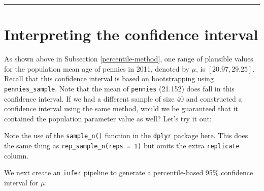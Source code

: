 \documentclass[12pt, krantz2,]{krantz}
\makeatletter
\newenvironment{Shaded}{\begin{snugshade}}{\end{snugshade}}
\newcommand{\DataTypeTok}[1]{\textcolor[rgb]{0.27,0.27,0.27}{#1}}
\newcommand{\DecValTok}[1]{\textcolor[rgb]{0.06,0.06,0.06}{#1}}
\newcommand{\KeywordTok}[1]{\textcolor[rgb]{0.27,0.27,0.27}{\textbf{#1}}}
\newcommand{\NormalTok}[1]{#1}
\newcommand{\OperatorTok}[1]{\textcolor[rgb]{0.43,0.43,0.43}{\textbf{#1}}}
\newcommand{\OtherTok}[1]{\textcolor[rgb]{0.37,0.37,0.37}{#1}}
\newcommand{\StringTok}[1]{\textcolor[rgb]{0.5,0.5,0.5}{#1}}
\newenvironment{kframe}{%
\medskip{}
\setlength{\fboxsep}{.8em}
 \def\at@end@of@kframe{}%
 \ifinner\ifhmode%
  \def\at@end@of@kframe{\end{minipage}}%
  \begin{minipage}{\columnwidth}%
 \fi\fi%
 \def\FrameCommand##1{\hskip\@totalleftmargin \hskip-\fboxsep
 \colorbox{shadecolor}{##1}\hskip-\fboxsep
     \hskip-\linewidth \hskip-\@totalleftmargin \hskip\columnwidth}%
 \MakeFramed {\advance\hsize-\width
   \@totalleftmargin\z@ \linewidth\hsize
   \@setminipage}}%
 {\par\unskip\endMakeFramed%
 \at@end@of@kframe}
\renewenvironment{Shaded}{\begin{kframe}}{\end{kframe}}
\makeatother
\begin{document}
\begin{center}\rule{0.5\linewidth}{\linethickness}\end{center}

\hypertarget{interpreting-the-confidence-interval}{%
\section{Interpreting the confidence interval}\label{interpreting-the-confidence-interval}}

As shown above in Subsection \ref{percentile-method}, one range of plausible values for the population mean age of pennies in 2011, denoted by \(\mu\), is \([20.97, 29.25]\). Recall that this confidence interval is based on bootstrapping using \texttt{pennies\_sample}. Note that the mean of \texttt{pennies} (21.152) does fall in this confidence interval. If we had a different sample of size 40 and constructed a confidence interval using the same method, would we be guaranteed that it contained the population parameter value as well? Let's try it out:

\begin{Shaded}
\end{Shaded}

Note the use of the \texttt{sample\_n()} function in the \texttt{dplyr} package here. This does the same thing as \texttt{rep\_sample\_n(reps\ =\ 1)} but omits the extra \texttt{replicate} column.

We next create an \texttt{infer} pipeline to generate a percentile-based 95\% confidence interval for \(\mu\):

\begin{Shaded}
\end{Shaded}
\end{document}
